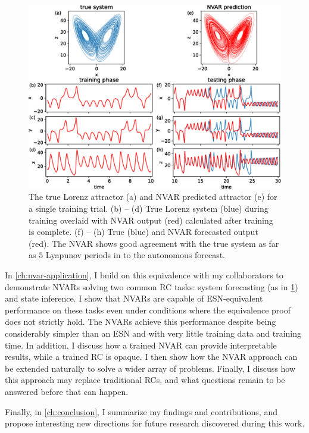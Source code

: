 \begin{figure}
  \includegraphics[width=\textwidth]{figures/nvar-predict-lorenz}
  \caption{The true Lorenz attractor (a) and NVAR predicted attractor
    (e) for a single training trial. (b) -- (d) True Lorenz system
    (blue) during training overlaid with NVAR output (red) calculated
    after training is complete. (f) -- (h) True (blue) and NVAR
    forecasted output (red). The NVAR shows good agreement with the
    true system as far as $5$ Lyapunov periods in to the autonomous
    forecast.}
  \label{fig:intro-nvar-predict-lorenz}
\end{figure}

In \cref{ch:nvar-application}, I build on this equivalence with my
collaborators to demonstrate NVARs solving two common RC tasks: system
forecasting (as in \cref{fig:intro-nvar-predict-lorenz}) and state
inference.  I show that NVARs are capable of ESN-equivalent performance
on these tasks even under conditions where the equivalence proof does
not strictly hold. The NVARs achieve this performance despite being
considerably simpler than an ESN and with very little training data and
training time. In addition, I discuss how a trained NVAR can provide
interpretable results, while a trained RC is opaque. I then show how
the NVAR approach can be extended naturally to solve a wider array of
problems. Finally, I discuss how this approach may replace traditional
RCs, and what questions remain to be answered before that can happen.

Finally, in \cref{ch:conclusion}, I summarize my findings and
contributions, and propose interesting new directions for future
research discovered during this work.
